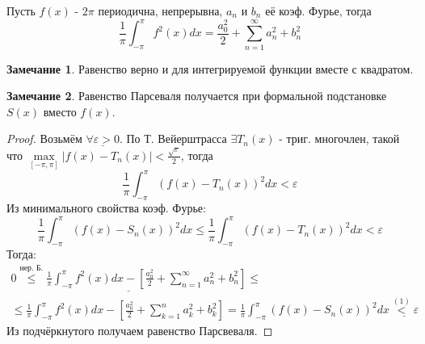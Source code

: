 \documentclass{article}
\theoremstyle{definition}
\numberwithin{theorem}{section}
\numberwithin{lemma}{section}
\numberwithin{definition}{section}
\numberwithin{corollary}{section}
\newtheorem*{remark}{Замечание}
\numberwithin{equation}{section}
\let\epsilon\varepsilon
\begin{document}
\begin{theorem} 
  Пусть $f(x)$ - $2\pi$ периодична, непрерывна,
  $a_n$ и $b_n$ её коэф. Фурье, тогда
  \[
    \frac{1}{\pi}\int_{-\pi}^{\pi}f^{2}(x)dx=\frac{a_0^{2}}{2}+\sum_{n=1}^{\infty}a_n^{2}+b_n^{2}
  \]
\end{theorem}
\begin{remark}
  Равенство верно и для интегрируемой функции вместе с квадратом.
\end{remark}
\begin{remark}
  Равенство Парсеваля получается при формальной подстановке $S(x)$ вместо $f(x)$.
\end{remark}
\begin{proof}
  Возьмём $\underline{\forall \epsilon > 0}$. По Т. Вейерштрасса
  $\exists T_n(x)$ - триг. многочлен, такой что
  $\max \limits_{[-\pi,\pi]}|f(x)-T_n(x)|<\frac{\sqrt{\epsilon}}{2}$, тогда
  \[
    \frac{1}{\pi}\int_{-\pi}^{\pi}(f(x)-T_n(x))^{2}dx<\epsilon
  \]
  Из минимального свойства коэф. Фурье:
  \[
    \frac{1}{\pi}\int_{-\pi}^{\pi}(f(x)-S_n(x))^{2}dx
    \le \frac{1}{\pi}\int_{-\pi}^{\pi}(f(x)-T_n(x))^{2}dx < \epsilon \tag{$1$}
  \]
  Тогда:
  \begin{gather*}
    \underline{0\overset{\text{нер. Б.}}{\le }\frac{1}{\pi}\int_{-\pi}^{\pi}f^{2}(x)dx-\left[\frac{a_0^{2}}{2}+\sum_{n=1}^{\infty}a_n^{2}+b_n^{2}\right]} \le \\
    \le \frac{1}{\pi}\int_{-\pi}^{\pi}f^{2}(x)dx- \left[\frac{a_0^{2}}{2}+\sum_{k=1}^{n}a_k^{2}+b_k^{2}\right]
    = \frac{1}{\pi}\int_{-\pi}^{\pi}(f(x)-S_n(x))^{2}dx \underline{\overset{(1)}{<} \epsilon}
  \end{gather*}
  Из подчёркнутого получаем равенство Парсвеваля.
\end{proof}
\end{document}
